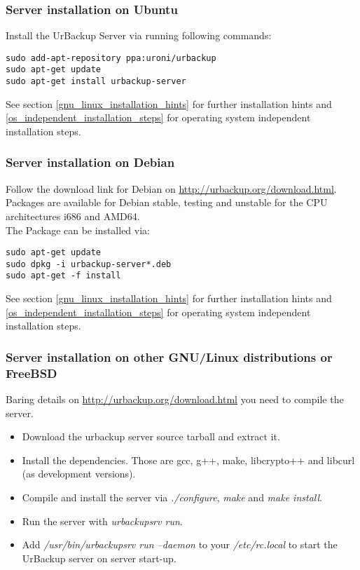 \documentclass[a4paper,10pt]{article}
\begin{document}
\subsubsection{Server installation on Ubuntu}

Install the UrBackup Server via running following commands:
\begin{verbatim}
sudo add-apt-repository ppa:uroni/urbackup
sudo apt-get update
sudo apt-get install urbackup-server
\end{verbatim}

\noindent See section \ref{gnu_linux_installation_hints} for further installation hints and \ref{os_independent_installation_steps} for operating system independent installation steps.


\subsubsection{Server installation on Debian}

Follow the download link for Debian on \url{http://urbackup.org/download.html}. Packages are available for Debian stable, testing and unstable for the CPU architectures i686 and AMD64.\\

\noindent The Package can be installed via:
\begin{verbatim}
sudo apt-get update
sudo dpkg -i urbackup-server*.deb
sudo apt-get -f install
\end{verbatim}

\noindent See section \ref{gnu_linux_installation_hints} for further installation hints and \ref{os_independent_installation_steps} for operating system independent installation steps.

\subsubsection{Server installation on other GNU/Linux distributions or FreeBSD}

Baring details on \url{http://urbackup.org/download.html} you need to compile the server.

\begin{itemize}
  \item Download the urbackup server source tarball and extract it.
  \item Install the dependencies. Those are gcc, g++, make, libcrypto++ and libcurl (as development versions).
  \item Compile and install the server via \textsl{./configure}, \textsl{make} and \textsl{make install}.
  \item Run the server with \textsl{urbackupsrv run}.
  \item Add \textsl{/usr/bin/urbackupsrv run --daemon} to your \textsl{/etc/rc.local} to start the UrBackup server on server start-up.
\end{itemize}
\end{document}
